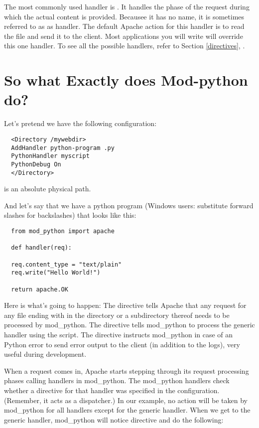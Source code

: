 The most commonly used handler is . It handles the
phase of the request during which the actual content is
provided. Becausee it has no name, it is sometimes referred to as as
 handler. The default Apache action for this handler is
to read the file and send it to the client. Most applications you will
write will override this one handler. To see all the possible
handlers, refer to Section \ref{directives},
.

\section{So what Exactly does Mod-python do?\label{tut-what-it-do}}

Let's pretend we have the following configuration: 
\begin{verbatim}
  <Directory /mywebdir>
  AddHandler python-program .py
  PythonHandler myscript
  PythonDebug On
  </Directory>
\end{verbatim}

  is an absolute physical path. 

And let's say that we have a python program (Windows users: substitute
forward slashes for backslashes)  that looks like
this:

\begin{verbatim}
  from mod_python import apache

  def handler(req):

  req.content_type = "text/plain"
  req.write("Hello World!")

  return apache.OK
\end{verbatim}    

Here is what's going to happen: The  directive tells
Apache that any request for any file ending with  in the
 directory or a subdirectory thereof needs to be
processed by mod_python. The  directive
tells mod_python to process the generic handler using the
 script. The  directive instructs
mod_python in case of an Python error to send error output to the
client (in addition to the logs), very useful during development.

When a request comes in, Apache starts stepping through its request
processing phases calling handlers in mod_python. The mod_python
handlers check whether a directive for that handler was specified in
the configuration. (Remember, it acts as a dispatcher.)  In our
example, no action will be taken by mod_python for all handlers except
for the generic handler. When we get to the generic handler,
mod_python will notice  directive and do
the following:

